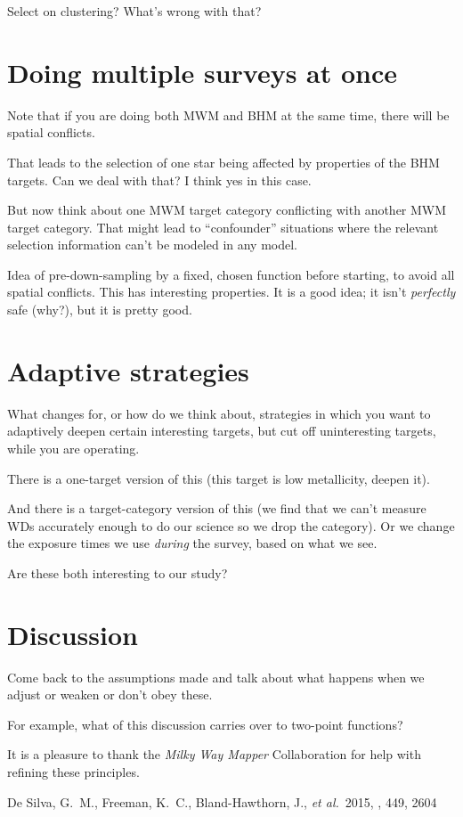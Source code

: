 \documentclass[modern]{aastex62}
\newcommand{\project}[1]{\textsl{#1}}
\newcommand{\foreign}[1]{\textsl{#1}}
\newcommand{\etal}{\foreign{et al.}}
\begin{document}
Select on clustering? What's wrong with that?

\section{Doing multiple surveys at once}

Note that if you are doing both MWM and BHM at the same time, there will be
spatial conflicts.

That leads to the selection of one star being affected by properties of the
BHM targets. Can we deal with that? I think yes in this case.

But now think about one MWM target category conflicting with another MWM target
category. That might lead to ``confounder'' situations where the relevant selection
information can't be modeled in any model.

Idea of pre-down-sampling by a fixed, chosen function before starting, to avoid
all spatial conflicts. This has interesting properties. It is a good idea; it isn't
\emph{perfectly} safe (why?), but it is pretty good.

\section{Adaptive strategies}

What changes for, or how do we think about, strategies in which you want to
adaptively deepen certain interesting targets, but cut off uninteresting targets,
while you are operating.

There is a one-target version of this (this target is low metallicity, deepen it).

And there is a target-category version of this (we find that we can't measure WDs
accurately enough to do our science so we drop the category). Or we change the exposure
times we use \emph{during} the survey, based on what we see.

Are these both interesting to our study?

\section{Discussion}

Come back to the assumptions made and talk about what happens when we
adjust or weaken or don't obey these.

For example, what of this discussion carries over to two-point functions?

\acknowledgements It is a pleasure to thank the \project{Milky Way
  Mapper} Collaboration for help with refining these principles.

\facilities{
ESA \project{Gaia},
}


\begin{thebibliography}{}
\bibitem[De Silva \etal(2015)]{galah} De Silva, G.~M., Freeman, K.~C., Bland-Hawthorn, J., \etal\ 2015, \mnras, 449, 2604 
\end{thebibliography}
\end{document}
